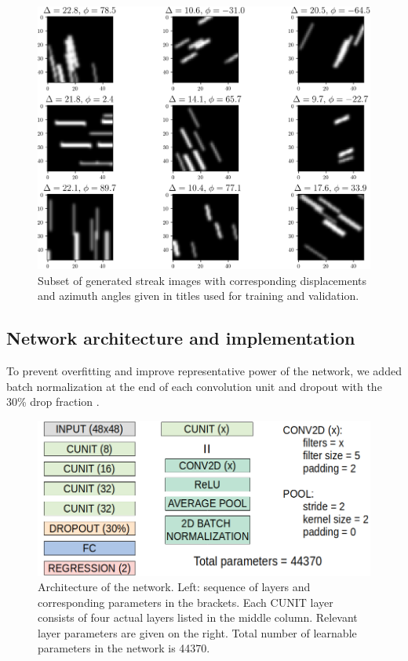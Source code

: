 \documentclass{svjour3}                     %
\begin{document}
\begin{figure}
\includegraphics[width=\textwidth]{figs/figure1.png}
\caption{Subset of generated streak images with corresponding displacements and azimuth angles given in titles used for training and validation.}
\label{fig:fig1}
\end{figure}

\subsection{Network architecture and implementation}

To prevent overfitting and improve representative power of the network, we added batch normalization at the end of each convolution unit \cite{ioffe2015batch} and dropout with the 30\% drop fraction \cite{srivastava2014dropout}.

\begin{figure}
\includegraphics[width=\textwidth]{figs/figure2.png}
\caption{Architecture of the network. Left: sequence of layers and corresponding parameters in the brackets. Each CUNIT layer consists of four actual layers listed in the middle column. Relevant layer parameters are given on the right. Total number of learnable parameters in the network is 44370.}
\label{fig:fig2}
\end{figure}
\end{document}
